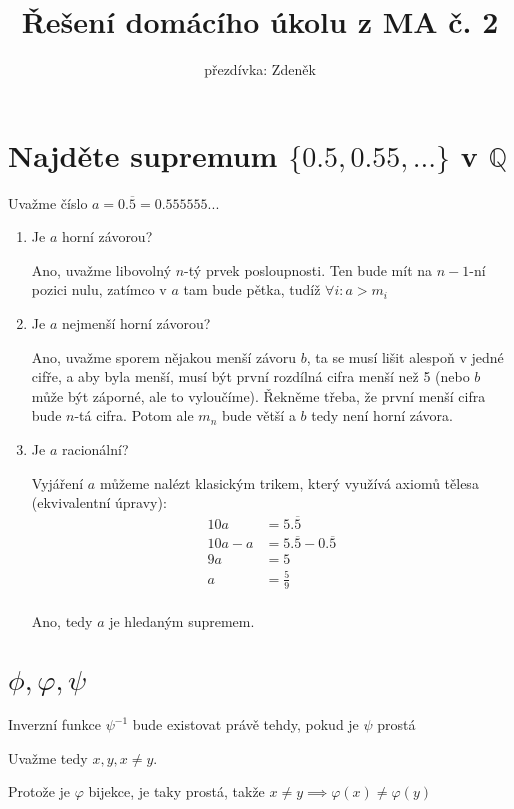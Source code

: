 \documentclass[10pt,a4paper]{article}
\title{Řešení domácího úkolu z MA č. 2}
\author{přezdívka: Zdeněk}
\date{}
\theoremstyle{plain}
\theoremstyle{definition}
\begin{document}
\maketitle

\section{Najděte supremum $\{ 0.5, 0.55, ... \}$ v $\mathbb{Q}$
}

Uvažme číslo $a = 0.\overline{5} = 0.555555...$

\begin{enumerate}
\item
Je $a$ horní závorou?

Ano, uvažme libovolný $n$-tý prvek posloupnosti. Ten bude mít na $n-1$-ní pozici nulu, zatímco v $a$ tam bude pětka, tudíž $\forall i: a > m_i$

\item 
Je $a$ nejmenší horní závorou?

Ano, uvažme sporem nějakou menší závoru $b$, ta se musí lišit alespoň v jedné cifře, a aby byla menší, musí být první rozdílná cifra menší než 5 (nebo $b$ může být záporné, ale to vyloučíme). Řekněme třeba, že první menší cifra bude $n$-tá cifra. Potom ale $m_n$ bude větší a $b$ tedy není horní závora.

\item
Je $a$ racionální?

Vyjáření $a$ můžeme nalézt klasickým trikem, který využívá axiomů tělesa (ekvivalentní úpravy):
\begin{align*}
10a &= 5.\overline{5} \\
10a - a &= 5.\overline{5} - 0.\overline{5} \\
9a &= 5 \\
a &= \frac{5}9 \\
\end{align*}

Ano, tedy $a$ je hledaným supremem.
\end{enumerate}

\section{$\phi, \varphi, \psi$}

Inverzní funkce $\psi^{-1}$ bude existovat právě tehdy, pokud je $\psi$ prostá 

Uvažme tedy $x,y, x \neq y$. 

Protože je $\varphi$ bijekce, je taky prostá, takže $x \neq y \implies \varphi(x) \neq \varphi(y)$
\end{document}
